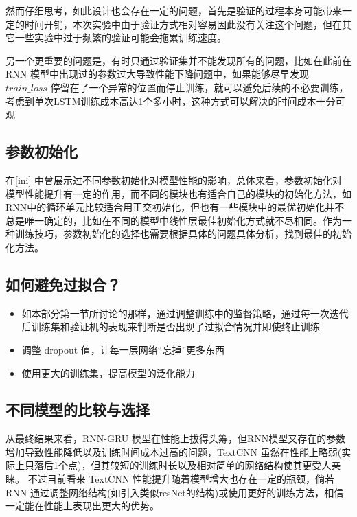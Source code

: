 \documentclass{article}
\begin{document}
\begin{spacing}{1.1}
	然而仔细思考，如此设计也会存在一定的问题，首先是验证的过程本身可能带来一定的时间开销，本次实验中由于验证方式相对容易因此没有关注这个问题，但在其它一些实验中过于频繁的验证可能会拖累训练速度。
	
	另一个更重要的问题是，有时只通过验证集并不能发现所有的问题，比如在此前在 RNN 模型中出现过的参数过大导致性能下降问题中，如果能够尽早发现 $train\_loss$ 停留在了一个异常的位置而停止训练，就可以避免后续的不必要训练，考虑到单次LSTM训练成本高达1个多小时，这种方式可以解决的时间成本十分可观
\subsection{参数初始化}
	\hspace{1.4em}
	在\ref{ini} 中曾展示过不同参数初始化对模型性能的影响，总体来看，参数初始化对模型性能提升有一定的作用，而不同的模块也有适合自己的模块的初始化方法，如RNN中的循环单元比较适合用正交初始化，但也有一些模块中的最优初始化并不总是唯一确定的，比如在不同的模型中线性层最佳初始化方式就不尽相同。作为一种训练技巧，参数初始化的选择也需要根据具体的问题具体分析，找到最佳的初始化方法。
\subsection{如何避免过拟合？}
	\begin{itemize}
		\item 如本部分第一节所讨论的那样，通过调整训练中的监督策略，通过每一次迭代后训练集和验证机的表现来判断是否出现了过拟合情况并即使终止训练
		\item 调整 dropout 值，让每一层网络“忘掉”更多东西
		\item 使用更大的训练集，提高模型的泛化能力
	\end{itemize}
\subsection{不同模型的比较与选择}
	\hspace{1.4em}
	从最终结果来看，RNN-GRU 模型在性能上拔得头筹，但RNN模型又存在的参数增加导致性能降低以及训练时间成本过高的问题，TextCNN 虽然在性能上略弱(实际上只落后1个点)，但其较短的训练时长以及相对简单的网络结构使其更受人亲睐。
	\hspace{1.4em}
	不过目前看来 TextCNN 性能提升随着模型增大也存在一定的瓶颈，倘若 RNN 通过调整网络结构(如引入类似resNet的结构)或使用更好的训练方法，相信一定能在性能上表现出更大的优势。

\end{spacing}
\end{document}
